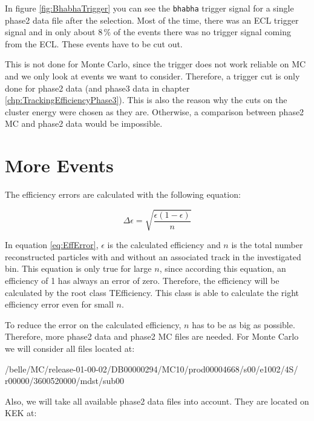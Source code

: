 \documentclass[a4paper,11pt,twosided,final,german,openbib,pdftex,listof=totoc,bibliography=totoc]{scrbook}
\begin{document}
In figure \ref{fig:BhabhaTrigger} you can see the \texttt{bhabha} trigger signal for a single phase2 data file after the selection. Most of the time, there was an ECL trigger signal and in only about $8\,\%$ of the events there was no trigger signal coming from the ECL. These events have to be cut out.

This is not done for Monte Carlo, since the trigger does not work reliable on MC and we only look at events we want to consider. Therefore, a trigger cut is only done for phase2 data (and phase3 data in chapter \ref{chp:TrackingEfficiencyPhase3}). This is also the reason why the cuts on the cluster energy were chosen as they are. Otherwise, a comparison between phase2 MC and phase2 data would be impossible.

\section{More Events}
\label{sec:Phase2MoreEvents}





The efficiency errors are calculated with the following equation:

\begin{equation}
\Delta \epsilon = \sqrt{\frac{\epsilon(1-\epsilon)}{n}}
\label{eq:EffError}
\end{equation}

In equation \ref{eq:EffError}, $\epsilon$ is the calculated efficiency and $n$ is the total number reconstructed particles with and without an associated track in the investigated bin. This equation is only true for large $n$, since according this equation, an efficiency of 1 has always an error of zero. Therefore, the efficiency will be calculated by the root class TEfficiency. This class is able to calculate the right efficiency error even for small $n$. \cite{TEfficiency}



To reduce the error on the calculated efficiency, $n$ has to be as big as possible. Therefore, more phase2 data and phase2 MC files are needed. For Monte Carlo we will consider all files located at: 
\newline

/belle/MC/release-01-00-02/DB00000294/MC10/prod00004668/s00/e1002/4S/
r00000/3600520000/mdst/sub00
\newline

Also, we will take all available phase2 data files into account. They are located on KEK at:
\newline
\end{document}
